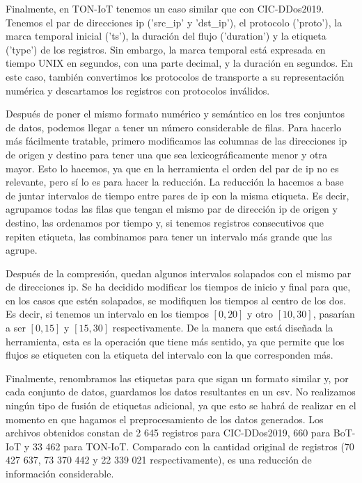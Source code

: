 Finalmente, en TON-IoT tenemos un caso similar que con CIC-DDos2019. Tenemos el par de direcciones \acrshort{ip}  ('src\_ip' y 'dst\_ip'), el protocolo ('proto'), la marca temporal inicial ('ts'), la duración del flujo ('duration') y la etiqueta ('type') de los registros. Sin embargo, la marca temporal está expresada en tiempo UNIX en segundos, con una parte decimal, y la duración en segundos. En este caso, también convertimos los protocolos de transporte a su representación numérica y descartamos los registros con protocolos inválidos.

Después de poner el mismo formato numérico y semántico en los tres conjuntos de datos, podemos llegar a tener un número considerable de filas. Para hacerlo más fácilmente tratable, primero modificamos las columnas de las direcciones \acrshort{ip} de origen y destino para tener una que sea lexicográficamente menor y otra mayor. Esto lo hacemos, ya que en la herramienta el orden del par de \acrshort{ip} no es relevante, pero sí lo es para hacer la reducción. La reducción la hacemos a base de juntar intervalos de tiempo entre pares de \acrshort{ip} con la misma etiqueta. Es decir, agrupamos todas las filas que tengan el mismo par de dirección \acrshort{ip} de origen y destino, las ordenamos por tiempo y, si tenemos registros consecutivos que repiten etiqueta, las combinamos para tener un intervalo más grande que las agrupe.

Después de la compresión, quedan algunos intervalos solapados con el mismo par de direcciones \acrshort{ip}. Se ha decidido modificar los tiempos de inicio y final para que, en los casos que estén solapados, se modifiquen los tiempos al centro de los dos. Es decir, si tenemos un intervalo en los tiempos $[0, 20]$ y otro $[10, 30]$, pasarían a ser $[0, 15]$ y $[15, 30]$ respectivamente. De la manera que está diseñada la herramienta, esta es la operación que tiene más sentido, ya que permite que los flujos se etiqueten con la etiqueta del intervalo con la que corresponden más.

Finalmente, renombramos las etiquetas para que sigan un formato similar y, por cada conjunto de datos, guardamos los datos resultantes en un \acrshort{csv}. No realizamos ningún tipo de fusión de etiquetas adicional, ya que esto se habrá de realizar en el momento en que hagamos el preprocesamiento de los datos generados. Los archivos obtenidos constan de 2 645 registros para CIC-DDos2019, 660 para BoT-IoT y 33 462 para TON-IoT. Comparado con la cantidad original de registros (70 427 637, 73 370 442 y 22 339 021 respectivamente), es una reducción de información considerable.

